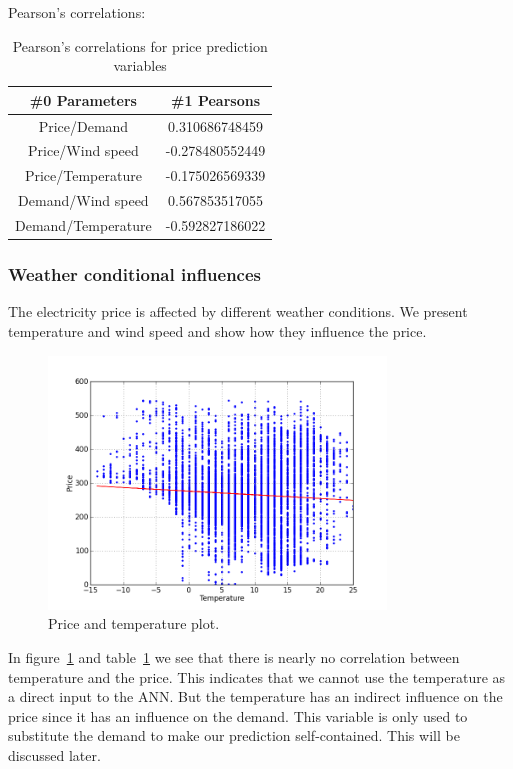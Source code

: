 Pearson's correlations:
\begin{table}[!ht]
\centering  %
\begin{tabular}{c c} %
 \#0 Parameters & \#1 Pearsons \\ [0.5ex] %
\hline                  %
Price/Demand & 0.310686748459 \\
Price/Wind speed & -0.278480552449  \\
Price/Temperature & -0.175026569339 \\
Demand/Wind speed & 0.567853517055 \\
Demand/Temperature & -0.592827186022 \\
\hline %
\end{tabular}
\caption{Pearson's correlations for price prediction variables} %
\label{table:pearsonsPriceVariables} %
\end{table}

\subsubsection{Weather conditional influences}
The electricity price is affected by different weather conditions. We present temperature and wind speed and show how they influence the price.

\begin{figure}[H]
\centering
\includegraphics[width=0.8\textwidth ,natwidth=410,natheight=237]{billeder/energy_price_plots/price_temp.png}
\caption{Price and temperature plot.}
\label{fig:price_temp}
\end{figure}

In figure~\ref{fig:price_temp} and table~\ref{table:pearsonsPriceVariables} we see that there is nearly no correlation between temperature and the price. This indicates that we cannot use the temperature as a direct input to the ANN. But the temperature has an indirect influence on the price since it has an influence on the demand. This variable is only used to substitute the demand to make our prediction self-contained. This will be discussed later.

